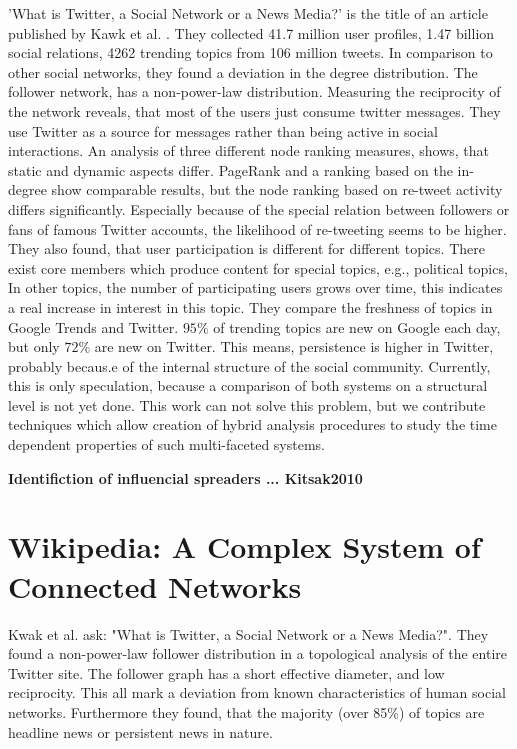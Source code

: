 \documentclass[a4paper,10pt]{scrbook}
\begin{document}
'What is Twitter, a Social Network or a News Media?' is the title of an article published by Kawk et al. \cite{Kwak2010}. They collected 41.7 million user profiles, 1.47 billion social relations, 4262 trending topics from 106 million tweets. In comparison to other social networks, they found a deviation in the degree distribution. The follower network, has a non-power-law distribution. Measuring the reciprocity of the network reveals, that most of the users just consume twitter messages. They use Twitter as a source for messages rather than being active in social interactions. An analysis of three different node ranking measures, shows, that static and dynamic aspects differ. 
PageRank and a ranking based on the in-degree show comparable results, but the node ranking based on re-tweet activity differs significantly. Especially because of the special relation between followers or fans of famous Twitter accounts, the likelihood of re-tweeting seems to be higher. They also found, that user participation is different for different topics. There exist core members which produce content for special topics, e.g., political topics, In other topics, the number of participating users grows over time, this indicates a real increase in interest in this topic. 
They compare the freshness of topics in Google Trends and Twitter. $95\%$ of trending topics are new on Google each day, but only $72\%$ are new on Twitter. This means, persistence is higher in Twitter, probably becaus.e of the internal structure of the social community. Currently, this is only speculation, because a comparison of both systems on a structural level is not yet done. This work can not solve this problem, but we contribute techniques which allow creation of hybrid analysis procedures to study the time dependent properties of such multi-faceted systems. 

\textbf{Identifiction of influencial spreaders ... Kitsak2010}

\section{Wikipedia: A Complex System of Connected Networks}

Kwak et al. \cite{Kwak2010} ask: "What is Twitter, a Social Network or a News Media?". They found a non-power-law follower distribution in a topological analysis of the entire Twitter site. The follower graph has a short effective diameter, and low reciprocity. This all mark a deviation from known characteristics of human social networks. Furthermore they found, that the majority (over 85\%) of topics are headline news or persistent news in nature.
\end{document}
